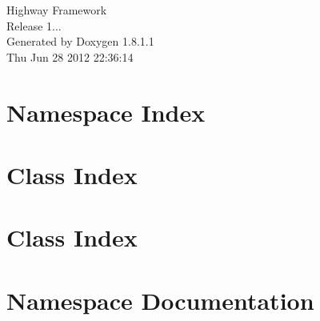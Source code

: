 \documentclass{book}
\begin{document}
\hypersetup{pageanchor=false,citecolor=blue}
\begin{titlepage}
\vspace*{7cm}
\begin{center}
{\Large Highway Framework \\[1ex]\large Release 1... }\\
\vspace*{1cm}
{\large Generated by Doxygen 1.8.1.1}\\
\vspace*{0.5cm}
{\small Thu Jun 28 2012 22:36:14}\\
\end{center}
\end{titlepage}
\clearemptydoublepage
{}
\tableofcontents
\clearemptydoublepage
{}
\hypersetup{pageanchor=true,citecolor=blue}
\chapter{Namespace Index}

\chapter{Class Index}

\chapter{Class Index}

\chapter{Namespace Documentation}














\end{document}
